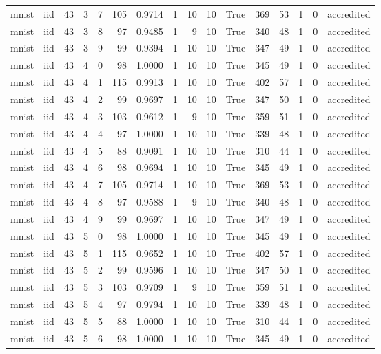 \begin{tabular}{llrrrrrrrrrrrrrl}
mnist & iid & 43 & 3 & 7 & 105 & 0.9714 & 1 & 10 & 10 & True & 369 & 53 & 1 & 0 & accredited \\
mnist & iid & 43 & 3 & 8 & 97 & 0.9485 & 1 & 9 & 10 & True & 340 & 48 & 1 & 0 & accredited \\
mnist & iid & 43 & 3 & 9 & 99 & 0.9394 & 1 & 10 & 10 & True & 347 & 49 & 1 & 0 & accredited \\
mnist & iid & 43 & 4 & 0 & 98 & 1.0000 & 1 & 10 & 10 & True & 345 & 49 & 1 & 0 & accredited \\
mnist & iid & 43 & 4 & 1 & 115 & 0.9913 & 1 & 10 & 10 & True & 402 & 57 & 1 & 0 & accredited \\
mnist & iid & 43 & 4 & 2 & 99 & 0.9697 & 1 & 10 & 10 & True & 347 & 50 & 1 & 0 & accredited \\
mnist & iid & 43 & 4 & 3 & 103 & 0.9612 & 1 & 9 & 10 & True & 359 & 51 & 1 & 0 & accredited \\
mnist & iid & 43 & 4 & 4 & 97 & 1.0000 & 1 & 10 & 10 & True & 339 & 48 & 1 & 0 & accredited \\
mnist & iid & 43 & 4 & 5 & 88 & 0.9091 & 1 & 10 & 10 & True & 310 & 44 & 1 & 0 & accredited \\
mnist & iid & 43 & 4 & 6 & 98 & 0.9694 & 1 & 10 & 10 & True & 345 & 49 & 1 & 0 & accredited \\
mnist & iid & 43 & 4 & 7 & 105 & 0.9714 & 1 & 10 & 10 & True & 369 & 53 & 1 & 0 & accredited \\
mnist & iid & 43 & 4 & 8 & 97 & 0.9588 & 1 & 9 & 10 & True & 340 & 48 & 1 & 0 & accredited \\
mnist & iid & 43 & 4 & 9 & 99 & 0.9697 & 1 & 10 & 10 & True & 347 & 49 & 1 & 0 & accredited \\
mnist & iid & 43 & 5 & 0 & 98 & 1.0000 & 1 & 10 & 10 & True & 345 & 49 & 1 & 0 & accredited \\
mnist & iid & 43 & 5 & 1 & 115 & 0.9652 & 1 & 10 & 10 & True & 402 & 57 & 1 & 0 & accredited \\
mnist & iid & 43 & 5 & 2 & 99 & 0.9596 & 1 & 10 & 10 & True & 347 & 50 & 1 & 0 & accredited \\
mnist & iid & 43 & 5 & 3 & 103 & 0.9709 & 1 & 9 & 10 & True & 359 & 51 & 1 & 0 & accredited \\
mnist & iid & 43 & 5 & 4 & 97 & 0.9794 & 1 & 10 & 10 & True & 339 & 48 & 1 & 0 & accredited \\
mnist & iid & 43 & 5 & 5 & 88 & 1.0000 & 1 & 10 & 10 & True & 310 & 44 & 1 & 0 & accredited \\
mnist & iid & 43 & 5 & 6 & 98 & 1.0000 & 1 & 10 & 10 & True & 345 & 49 & 1 & 0 & accredited \\

\end{tabular}
